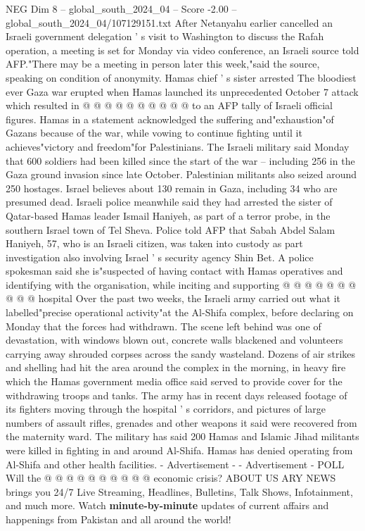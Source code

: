 \begin{textsample}{NEG Dim 8 – global\_south\_2024\_04 – Score -2.00 – global\_south\_2024\_04/107129151.txt}
After Netanyahu earlier cancelled an Israeli government delegation ' s visit to Washington to discuss the Rafah operation, a meeting is set for Monday via video conference, an Israeli source told AFP."There may be a meeting in person later this week,"said the source, speaking on condition of anonymity.
Hamas chief ' s sister arrested The bloodiest ever Gaza war erupted when Hamas launched its unprecedented October 7 attack which resulted in @ @ @ @ @ @ @ @ @ @ to an AFP tally of Israeli official figures.
Hamas in a statement acknowledged the suffering and"exhaustion"of Gazans because of the war, while vowing to continue fighting until it achieves"victory and freedom"for Palestinians.
The Israeli military said Monday that 600 soldiers had been killed since the start of the war -- including 256 in the Gaza ground invasion since late October.
Palestinian militants also seized around 250 hostages.
Israel believes about 130 remain in Gaza, including 34 who are presumed dead.
Israeli police meanwhile said they had arrested the sister of Qatar-based Hamas leader Ismail Haniyeh, as part of a terror probe, in the southern Israel town of Tel Sheva.
Police told AFP that Sabah Abdel Salam Haniyeh, 57, who is an Israeli citizen, was taken into custody as part investigation also involving Israel ' s security agency Shin Bet.
A police spokesman said she is"suspected of having contact with Hamas operatives and identifying with the organisation, while inciting and supporting @ @ @ @ @ @ @ @ @ @ hospital Over the past two weeks, the Israeli army carried out what it labelled"precise operational activity"at the Al-Shifa complex, before declaring on Monday that the forces had withdrawn.
The scene left behind was one of devastation, with windows blown out, concrete walls blackened and volunteers carrying away shrouded corpses across the sandy wasteland.
Dozens of air strikes and shelling had hit the area around the complex in the morning, in heavy fire which the Hamas government media office said served to provide cover for the withdrawing troops and tanks.
The army has in recent days released footage of its fighters moving through the hospital ' s corridors, and pictures of large numbers of assault rifles, grenades and other weapons it said were recovered from the maternity ward.
The military has said 200 Hamas and Islamic Jihad militants were killed in fighting in and around Al-Shifa.
Hamas has denied operating from Al-Shifa and other health facilities. - Advertisement - - Advertisement - POLL Will the @ @ @ @ @ @ @ @ @ @ economic crisis?
ABOUT US ARY NEWS brings you 24/7 Live Streaming, Headlines, Bulletins, Talk Shows, Infotainment, and much more.
Watch \textbf{minute-by-minute} updates of current affairs and happenings from Pakistan and all around the world!

\end{textsample}
